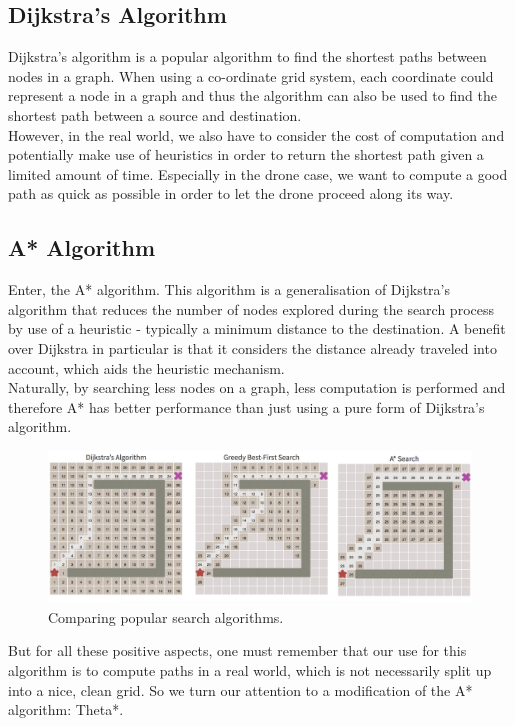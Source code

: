 \documentclass[a4paper,11pt,titlepage]{report}
\begin{document}
\subsection{Dijkstra's Algorithm}
Dijkstra's algorithm is a popular algorithm to find the shortest paths between nodes in a graph. When using a co-ordinate grid system, each coordinate could represent a node in a graph and thus the algorithm can also be used to find the shortest path between a source and destination. \\

However, in the real world, we also have to consider the cost of computation and potentially make use of heuristics in order to return the shortest path given a limited amount of time. Especially in the drone case, we want to compute a good path as quick as possible in order to let the drone proceed along its way.

\subsection{A* Algorithm}
Enter, the A* algorithm. This algorithm is a generalisation of Dijkstra's algorithm that reduces the number of nodes explored during the search process by use of a heuristic - typically a minimum distance to the destination. A benefit over Dijkstra in particular is that it considers the distance already traveled into account, which aids the heuristic mechanism. \\

Naturally, by searching less nodes on a graph, less computation is performed and therefore A* has better performance than just using a pure form of Dijkstra's algorithm.

\begin{figure}[!hbpt]
  \center
  \includegraphics[width=\linewidth]{img/search_comparison.png}
  \caption{Comparing popular search algorithms. \cite{Balaji2017}}
  \label{fig:search_comparison}
\end{figure}

\clearpage
But for all these positive aspects, one must remember that our use for this algorithm is to compute paths in a real world, which is not necessarily split up into a nice, clean grid. So we turn our attention to a modification of the A* algorithm: Theta*.
\end{document}
